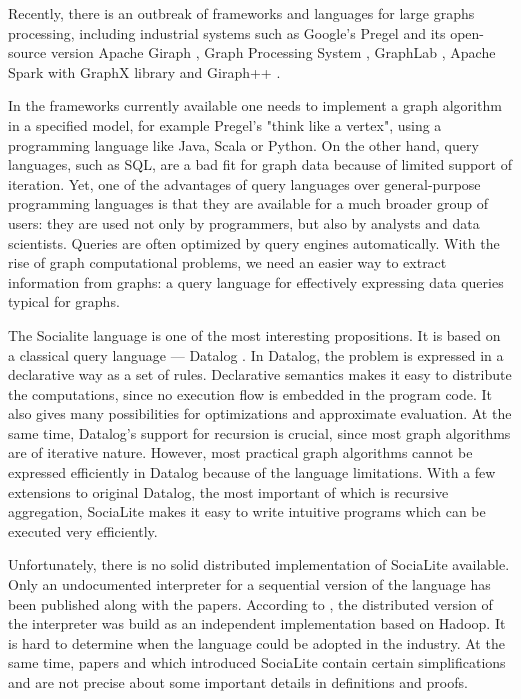 Recently, there is an outbreak of frameworks and languages for large graphs processing, including industrial systems such as Google's Pregel \cite{pregel} and its open-source version Apache Giraph \cite{giraph}, Graph Processing System \cite{gps}, GraphLab \cite{graphlabwww, graphlab, graphlab2}, Apache Spark with GraphX library \cite{spark2, sparkwww} and Giraph++ \cite{giraphpp}.

In the frameworks currently available one needs to implement a graph algorithm in a specified model, for example Pregel's "think like a vertex", using a programming language like Java, Scala or Python. On the other hand, query languages, such as SQL, are a bad fit for graph data because of limited support of iteration. Yet, one of the advantages of query languages over general-purpose programming languages is that they are available for a much broader group of users: they are used not only by programmers, but also by analysts and data scientists. Queries are often optimized by query engines automatically. With the rise of graph computational problems, we need an easier way to extract information from graphs: a query language for effectively expressing data queries typical for graphs.

The Socialite \cite{socialite, distsoc} language is one of the most interesting propositions. It is based on a classical query language --- Datalog \cite{fod}. In Datalog, the problem is expressed in a declarative way as a set of rules. Declarative semantics makes it easy to distribute the computations, since no execution flow is embedded in the program code. It also gives many possibilities for optimizations and approximate evaluation. At the same time, Datalog's support for recursion is crucial, since most graph algorithms are of iterative nature. However, most practical graph algorithms cannot be expressed efficiently in Datalog because of the language limitations. With a few extensions to original Datalog, the most important of which is recursive aggregation, SociaLite makes it easy to write intuitive programs which can be executed very efficiently.

Unfortunately, there is no solid distributed implementation of SociaLite available. Only an undocumented interpreter for a sequential version of the language has been published along with the papers. According to \cite{distsoc}, the distributed version of the interpreter was build as an independent implementation based on Hadoop. It is hard to determine when the language could be adopted in the industry. At the same time, papers \cite{socialite} and \cite{distsoc} which introduced SociaLite contain certain simplifications and are not precise about some important details in definitions and proofs.

